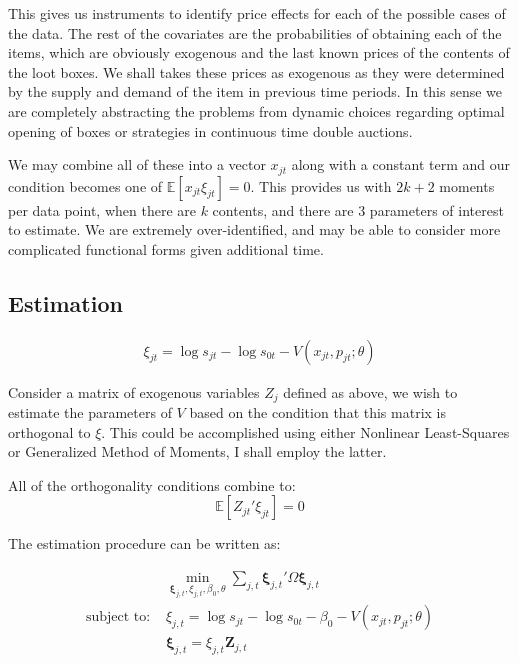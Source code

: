 \documentclass[12pt]{paper}
\newcommand{\exV}[1]{\mathbb{E} \left [ #1 \right ]}
\begin{document}
This gives us instruments to identify price effects for each of the
possible cases of the data. The rest of the covariates are the
probabilities of obtaining each of the items, which are obviously
exogenous and the last known prices of the contents of the loot
boxes. We shall takes these prices as exogenous as they were
determined by the supply and demand of the item in previous time
periods. In this sense we are completely abstracting the problems from
dynamic choices regarding optimal opening of boxes or strategies in
continuous time double auctions. 

We may combine all of these into a vector $x_{jt}$ along with a
constant term and our condition becomes one of
$\exV{x_{jt}\xi_{jt}} = 0$. This provides us with $2k + 2$ moments per
data point, when there are $k$ contents, and there are $3$
parameters of interest to estimate. We are extremely over-identified,
and may be able to consider more complicated functional forms given
additional time.


\subsection{Estimation}

\begin{align*}
  \xi_{jt} = \log s_{jt} - \log s_{0t} - V( x_{jt}, p_{jt}; \theta)
\end{align*}


Consider a matrix of exogenous variables $Z_j$ defined as above, we wish
to estimate the parameters of $V$ based on the condition that this
matrix is orthogonal to $\xi$. This could be accomplished using either
Nonlinear Least-Squares or Generalized Method of Moments, I shall
employ the latter.

All of the orthogonality conditions combine to:
\begin{equation*}
  \exV{Z_{jt}'\xi_{jt}} = 0
\end{equation*}

The estimation procedure can be written as:

\begin{align}
  &\min_{\bm{\xi}_{j,t}, \xi_{j,t}, \beta_0, \theta} \sum_{j,t}\bm{\xi}_{j,t}' \Omega \bm{\xi}_{j,t}\\
  \text{subject to: } &\xi_{j,t} = \log s_{jt} - \log s_{0t} - \beta_0
                        - V( x_{jt}, p_{jt}; \theta)\\
  &\bm{\xi}_{j,t} = \xi_{j,t} \bm{Z}_{j,t}  
\end{align}
\end{document}
